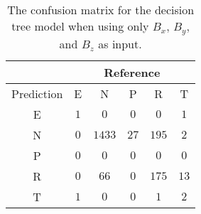 \begin{table}[!ht]
	\centering
	\begin{tabular}{|c|c|c|c|c|c|}
		\hline
		 & \multicolumn{5}{|c|}{Reference} \\ \hline
		 Prediction & E & N & P & R & T \\ \hline
		 E & $1$ & $0$ & $0$ & $0$ & $1$ \\ \hline
		 N & $0$ & $1433$ & $27$ & $195$ & $2$ \\ \hline
		 P & $0$ & $0$ & $0$ & $0$ & $0$ \\ \hline
		 R & $0$ & $66$ & $0$ & $175$ & $13$ \\ \hline
		 T & $1$ & $0$ & $0$ & $1$ & $2$ \\ \hline
	\end{tabular}
	\caption{The confusion matrix for the decision tree model when using only $B_{x}$, $B_{y}$, and $B_{z}$ as input.}
	\label{tab:cm:coord:C5.0}
\end{table}
